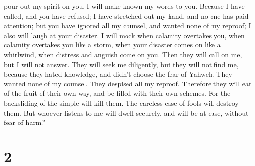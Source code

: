 pour out my spirit on you. I will make known my words to you.
 Because I have called, and you have refused; I have
stretched out my hand, and no one has paid attention;  but
you have ignored all my counsel, and wanted none of my reproof;
 I also will laugh at your disaster. I will mock when
calamity overtakes you,  when calamity overtakes you like a
storm, when your disaster comes on like a whirlwind, when distress and
anguish come on you.  Then they will call on me, but I will
not answer. They will seek me diligently, but they will not find me,
 because they hated knowledge, and didn't choose the fear
of Yahweh.  They wanted none of my counsel. They despised
all my reproof.  Therefore they will eat of the fruit of
their own way, and be filled with their own schemes.  For
the backsliding of the simple will kill them. The careless ease of fools
will destroy them.  But whoever listens to me will dwell
securely, and will be at ease, without fear of harm.''

\hypertarget{section-1}{%
\section{2}\label{section-1}}

